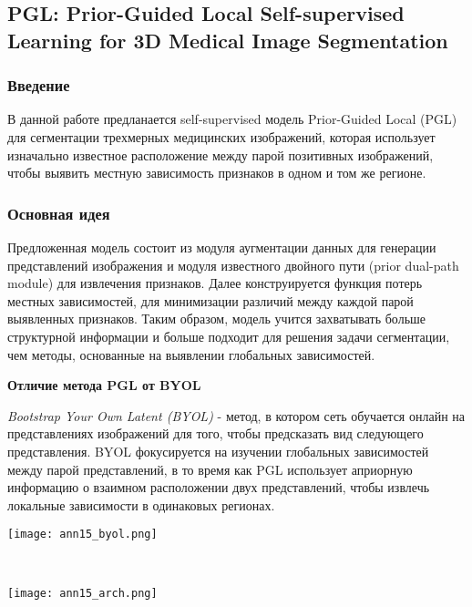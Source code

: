 \subsection*{PGL: Prior-Guided Local Self-supervised Learning
for 3D Medical Image Segmentation}

\subsubsection*{Введение}
В данной работе \cite{ann15} предланается self-supervised модель Prior-Guided Local (PGL) 
для сегментации трехмерных медицинских изображений, которая использует изначально
известное расположение между парой позитивных изображений, чтобы выявить местную 
зависимость признаков в одном и том же регионе.
\subsubsection*{Основная идея}
Предложенная модель состоит из модуля аугментации данных для генерации 
представлений изображения и модуля известного двойного пути (prior dual-path module)
для извлечения признаков. Далее конструируется функция потерь местных зависимостей, 
для минимизации различий между каждой парой выявленных признаков. Таким образом, модель
учится захватывать больше структурной информации и больше подходит для решения задачи сегментации, 
чем методы, основанные на выявлении глобальных зависимостей. 
\par 
\textbf{Отличие метода PGL от BYOL} \par
\textit{Bootstrap Your Own Latent (BYOL)} - метод, в котором сеть 
обучается онлайн на представлениях изображений для того, чтобы предсказать вид
следующего представления. BYOL фокусируется на изучении глобальных зависимостей между 
парой представлений, в то время как PGL использует априорную информацию о
взаимном расположении двух представлений, чтобы извлечь локальные зависимости в одинаковых регионах.


\begin{minipage}{1.0\linewidth}
    \begin{center}
        \texttt{[image: ann15\_byol.png]} \\
    \end{center}
\end{minipage}
\\
\begin{minipage}{1.0\linewidth}
    \begin{center}
        \texttt{[image: ann15\_arch.png]} \\
    \end{center}
\end{minipage}

